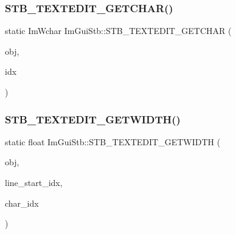 \hypertarget{namespace_im_gui_stb_a21130c94f2ec487b3c1d4316a1447174}{}\label{namespace_im_gui_stb_a21130c94f2ec487b3c1d4316a1447174} 
\subsubsection{\texorpdfstring{S\+T\+B\+\_\+\+T\+E\+X\+T\+E\+D\+I\+T\+\_\+\+G\+E\+T\+C\+H\+A\+R()}{STB\_TEXTEDIT\_GETCHAR()}}
{\footnotesize\ttfamily static Im\+Wchar Im\+Gui\+Stb\+::\+S\+T\+B\+\_\+\+T\+E\+X\+T\+E\+D\+I\+T\+\_\+\+G\+E\+T\+C\+H\+AR (\begin{DoxyParamCaption}\item[{const S\+T\+B\+\_\+\+T\+E\+X\+T\+E\+D\+I\+T\+\_\+\+S\+T\+R\+I\+NG $\ast$}]{obj,  }\item[{int}]{idx }\end{DoxyParamCaption})\hspace{0.3cm}{\ttfamily [static]}}

\hypertarget{namespace_im_gui_stb_ad4b4708ebde3dbcf2608a9acfb4550d2}{}\label{namespace_im_gui_stb_ad4b4708ebde3dbcf2608a9acfb4550d2} 
\subsubsection{\texorpdfstring{S\+T\+B\+\_\+\+T\+E\+X\+T\+E\+D\+I\+T\+\_\+\+G\+E\+T\+W\+I\+D\+T\+H()}{STB\_TEXTEDIT\_GETWIDTH()}}
{\footnotesize\ttfamily static float Im\+Gui\+Stb\+::\+S\+T\+B\+\_\+\+T\+E\+X\+T\+E\+D\+I\+T\+\_\+\+G\+E\+T\+W\+I\+D\+TH (\begin{DoxyParamCaption}\item[{S\+T\+B\+\_\+\+T\+E\+X\+T\+E\+D\+I\+T\+\_\+\+S\+T\+R\+I\+NG $\ast$}]{obj,  }\item[{int}]{line\+\_\+start\+\_\+idx,  }\item[{int}]{char\+\_\+idx }\end{DoxyParamCaption})\hspace{0.3cm}{\ttfamily [static]}}

